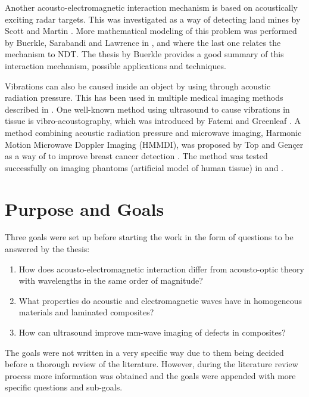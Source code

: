 \documentclass[11pt,twoside]{eitExjobb}
\begin{document}
	Another acousto-electromagnetic interaction mechanism is based on acoustically exciting radar targets. This was investigated as a way of detecting land mines by Scott and Martin \cite{Scott1999}. More mathematical modeling of this problem was performed by Buerkle, Sarabandi and Lawrence in \cite{Lawrence2001}, \cite{Buerkle2008} and \cite{Buerkle2009} where the last one relates the mechanism to NDT. The thesis by Buerkle \cite{Buerkle2007} provides a good summary of this interaction mechanism, possible applications and techniques.
	
	Vibrations can also be caused inside an object by using through acoustic radiation pressure. This has been used in multiple medical imaging methods described in \cite{Wang2018}. One well-known method using ultrasound to cause vibrations in tissue is vibro-acoustography, which was introduced by Fatemi and Greenleaf \cite{Fatemi1998}. A method combining acoustic radiation pressure and microwave imaging, Harmonic Motion Microwave Doppler Imaging (HMMDI), was proposed by Top and Gençer as a way of  to improve breast cancer detection \cite{Top2014}. The method was tested successfully on imaging phantoms (artificial model of human tissue) in \cite{Top2016} and \cite{Tafreshi2017}.
	
	\section{Purpose and Goals}
	Three goals were set up before starting the work in the form of questions to be answered by the thesis:
	\begin{enumerate}
		\item How does acousto-electromagnetic interaction differ from acousto-optic theory with wavelengths in the same order of magnitude?
		\item What properties do acoustic and electromagnetic waves have in homogeneous materials and laminated composites?
		\item How can ultrasound improve mm-wave imaging of defects in composites?
	\end{enumerate}
	The goals were not written in a very specific way due to them being decided before a thorough review of the literature. However, during the literature review process more information was obtained and the goals were appended with more specific questions and sub-goals.
	
\end{document}
